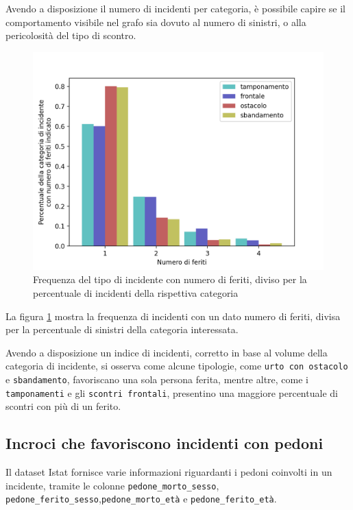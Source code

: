 \documentclass[a4paper,12pt]{report}
\newcommand{\columnstyle}[1]{\texttt{#1}}
\begin{document}
Avendo a disposizione il numero di incidenti per categoria, è possibile capire 
se il comportamento visibile nel grafo sia dovuto al numero di sinistri, o alla 
pericolosità del tipo di scontro. 

\begin{figure}
    \includegraphics[width=\linewidth]{../src/incidenti/incidenti_senza_coords/natura_incidente/perc_natura_incidente.png}
    \caption{Frequenza del tipo di incidente con numero di feriti, diviso per la percentuale di incidenti della rispettiva categoria}
    \label{fig:perc-numero-feriti}
\end{figure}

La figura \ref{fig:perc-numero-feriti} mostra la frequenza di incidenti con un dato numero 
di feriti, divisa per la percentuale di sinistri della categoria interessata.

Avendo a disposizione un indice di incidenti, corretto in base al volume della categoria 
di incidente, si osserva come alcune tipologie, come \columnstyle{urto con ostacolo} 
e \columnstyle{sbandamento}, favoriscano una sola persona ferita, mentre altre, 
come i \columnstyle{tamponamenti} e gli \columnstyle{scontri frontali}, presentino 
una maggiore percentuale di scontri con più di un ferito.

\subsection{Incroci che favoriscono incidenti con pedoni}

Il dataset Istat fornisce varie informazioni riguardanti i pedoni coinvolti in un 
incidente, tramite le colonne \columnstyle{pedone\_morto\_sesso}, 
\columnstyle{pedone\_ferito\_sesso},\columnstyle{pedone\_morto\_età} e 
\columnstyle{pedone\_ferito\_età}.
\end{document}
